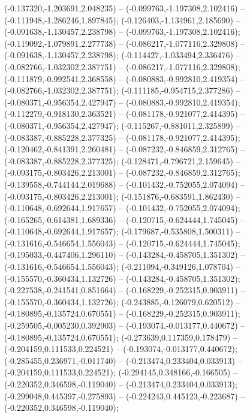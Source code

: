 (-0.137320,-1.203691,2.048235) -- (-0.099763,-1.197308,2.102416) -- (-0.111948,-1.286246,1.897845);
 (-0.126403,-1.134961,2.185690) -- (-0.091638,-1.130457,2.238798) -- (-0.099763,-1.197308,2.102416);
 (-0.119092,-1.079891,2.277738) -- (-0.086217,-1.077116,2.329808) -- (-0.091638,-1.130457,2.238798);
 (-0.114427,-1.033494,2.336476) -- (-0.082766,-1.032302,2.387751) -- (-0.086217,-1.077116,2.329808);
 (-0.111879,-0.992541,2.368558) -- (-0.080883,-0.992810,2.419354) -- (-0.082766,-1.032302,2.387751);
 (-0.111185,-0.954715,2.377286) -- (-0.080371,-0.956354,2.427947) -- (-0.080883,-0.992810,2.419354);
 (-0.112279,-0.918130,2.363521) -- (-0.081178,-0.921077,2.414395) -- (-0.080371,-0.956354,2.427947);
 (-0.115267,-0.881011,2.325899) -- (-0.083387,-0.885228,2.377325) -- (-0.081178,-0.921077,2.414395);
 (-0.120462,-0.841391,2.260481) -- (-0.087232,-0.846859,2.312765) -- (-0.083387,-0.885228,2.377325);
 (-0.128471,-0.796721,2.159645) -- (-0.093175,-0.803426,2.213001) -- (-0.087232,-0.846859,2.312765);
 (-0.139558,-0.744144,2.019688) -- (-0.101432,-0.752055,2.074094) -- (-0.093175,-0.803426,2.213001);
 (-0.151876,-0.683591,1.862430) -- (-0.110648,-0.692644,1.917657) -- (-0.101432,-0.752055,2.074094);
 (-0.165265,-0.614381,1.689336) -- (-0.120715,-0.624444,1.745045) -- (-0.110648,-0.692644,1.917657);
 (-0.179687,-0.535808,1.500311) -- (-0.131616,-0.546654,1.556043) -- (-0.120715,-0.624444,1.745045);
 (-0.195033,-0.447406,1.296110) -- (-0.143284,-0.458705,1.351302) -- (-0.131616,-0.546654,1.556043);
 (-0.211094,-0.349126,1.078704) -- (-0.155570,-0.360434,1.132726) -- (-0.143284,-0.458705,1.351302);
 (-0.227538,-0.241541,0.851664) -- (-0.168229,-0.252315,0.903911) -- (-0.155570,-0.360434,1.132726);
 (-0.243885,-0.126079,0.620512) -- (-0.180895,-0.135724,0.670551) -- (-0.168229,-0.252315,0.903911);
 (-0.259505,-0.005230,0.392903) -- (-0.193074,-0.013177,0.440672) -- (-0.180895,-0.135724,0.670551);
 (-0.273639,0.117359,0.178479) -- (-0.204159,0.111533,0.224521) -- (-0.193074,-0.013177,0.440672);
 (-0.285455,0.236971,-0.011740) -- (-0.213474,0.233404,0.033913) -- (-0.204159,0.111533,0.224521);
 (-0.294145,0.348166,-0.166505) -- (-0.220352,0.346598,-0.119040) -- (-0.213474,0.233404,0.033913);
 (-0.299048,0.445397,-0.275893) -- (-0.224243,0.445123,-0.223687) -- (-0.220352,0.346598,-0.119040);
